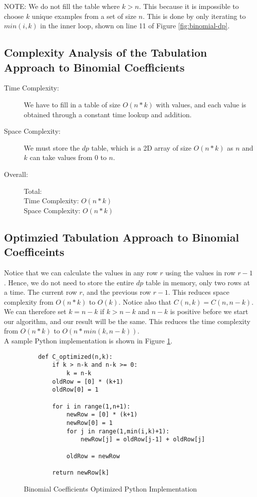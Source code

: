 NOTE: We do not fill the table where $k > n$.
This because it is impossible to choose $k$ unique examples from a set of size $n$.
This is done by only iterating to $min(i,k)$ in the inner loop, shown on line 11 of Figure \ref{fig:binomial-dp}.

\subsection{Complexity Analysis of the Tabulation Approach to Binomial Coefficients}

\begin{description}
    \item[Time Complexity:]
        We have to fill in a table of size $O(n * k)$ with values, and each value is obtained through a constant time lookup and addition.

    \item[Space Complexity:] 
        We must store the $dp$ table, which is a 2D array of size $O(n * k)$ as $n$ and $k$ can take values from $0$ to $n$.
        
    \item[Overall:] Total:\\
        Time Complexity: $O(n * k)$\\
        Space Complexity: $O(n * k)$
    
\end{description}

\subsection{Optimzied Tabulation Approach to Binomial Coefficeints}\label{subsec:binomial-coefficents-optimized}
Notice that we can calculate the values in any row $r$ using the values in row $r-1$.
Hence, we do not need to store the entire $dp$ table in memory, only two rows at a time.
The current row $r$, and the previous row $r-1$.
This reduces space complexity from $O(n * k)$ to $O(k)$.
Notice also that $C(n,k) = C(n,n-k)$.
We can therefore set $k = n-k$ if $k > n-k$ and $n-k$ is positive before we start our algorithm, and our result will be the same.
This reduces the time complexity from $O(n * k)$ to $O(n * min(k,n-k))$.\\

A sample Python implementation is shown in Figure \ref{fig:binomial-optimized}.

\begin{figure}[H]
    \centering
    \begin{lstlisting}
    def C_optimized(n,k):
        if k > n-k and n-k >= 0:
            k = n-k
        oldRow = [0] * (k+1)
        oldRow[0] = 1
    
        for i in range(1,n+1):
            newRow = [0] * (k+1)
            newRow[0] = 1
            for j in range(1,min(i,k)+1):
                newRow[j] = oldRow[j-1] + oldRow[j]
    
            oldRow = newRow
              
        return newRow[k]
    \end{lstlisting}
    \caption{Binomial Coefficients Optimized Python Implementation}
    \label{fig:binomial-optimized}
\end{figure}


